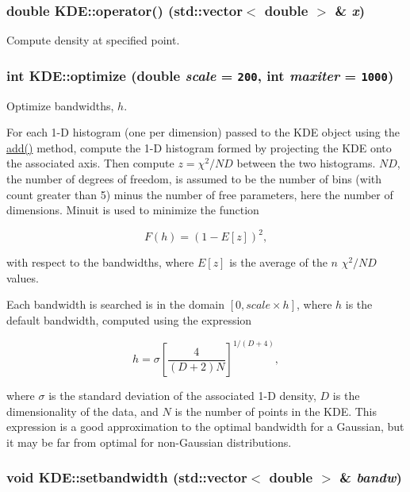\hypertarget{classKDE_a10}{
\subsubsection[operator()]{\setlength{\rightskip}{0pt plus 5cm}double KDE::operator() (std::vector$<$ double $>$ \& {\em x})}}
\label{classKDE_a10}


Compute density at specified point. 

\hypertarget{classKDE_a7}{
\subsubsection[optimize]{\setlength{\rightskip}{0pt plus 5cm}int KDE::optimize (double {\em scale} = {\tt 200}, int {\em maxiter} = {\tt 1000})}}
\label{classKDE_a7}


Optimize bandwidths, $h$. 

For each 1-D histogram (one per dimension) passed to the KDE object using the \hyperlink{classKDE_a4}{add()} method, compute the 1-D histogram formed by projecting the KDE onto the associated axis. Then compute $z = \chi^2/ND$ between the two histograms. $ND$, the number of degrees of freedom, is assumed to be the number of bins (with count greater than 5) minus the number of free parameters, here the number of dimensions. Minuit is used to minimize the function

\[ F(h) = (1 - E[z])^2, \]

with respect to the bandwidths, where $E[z]$ is the average of the $n$ $\chi^2/ND$ values.

Each bandwidth is searched is in the domain $[0,scale \times h]$, where $h$ is the default bandwidth, computed using the expression

\[ h = \sigma \left[\frac{4}{(D+2)N}\right]^{1/(D+4)}, \]

where $\sigma$ is the standard deviation of the associated 1-D density, $D$ is the dimensionality of the data, and $N$ is the number of points in the KDE. This expression is a good approximation to the optimal bandwidth for a Gaussian, but it may be far from optimal for non-Gaussian distributions. \hypertarget{classKDE_a20}{
\subsubsection[setbandwidth]{\setlength{\rightskip}{0pt plus 5cm}void KDE::setbandwidth (std::vector$<$ double $>$ \& {\em bandw})}}
\label{classKDE_a20}


